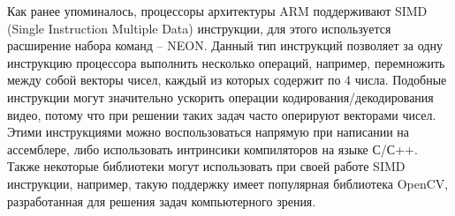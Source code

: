 Как ранее упоминалось, процессоры архитектуры ARM поддерживают SIMD (Single Instruction Multiple Data) инструкции, для 
этого используется расширение набора команд -- NEON. Данный тип инструкций позволяет за одну инструкцию процессора 
выполнить несколько операций, например, перемножить между собой векторы чисел, каждый из которых содержит по 4 числа.
Подобные инструкции могут значительно ускорить операции кодирования/декодирования видео, потому что при решении таких 
задач часто оперируют векторами чисел. Этими инструкциями можно воспользоваться напрямую при написании на ассемблере, либо 
использовать интринсики компиляторов на языке С/С++. Также некоторые библиотеки могут использовать при своей работе SIMD 
инструкции, например, такую поддержку имеет популярная библиотека OpenCV, разработанная для решения задач компьютерного 
зрения.

\clearpage
